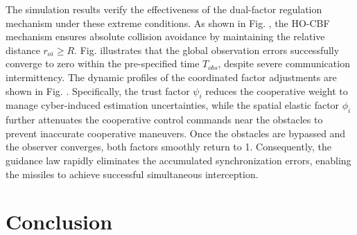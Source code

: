 \documentclass[lettersize,journal]{IEEEtran}
\begin{document}
The simulation results verify the effectiveness of the dual-factor regulation mechanism under these extreme conditions. As shown in Fig. , the HO-CBF mechanism ensures absolute collision avoidance by maintaining the relative distance $r_{oi} \ge R$. Fig. illustrates that the global observation errors successfully converge to zero within the pre-specified time $T_{obs}$, despite severe communication intermittency. The dynamic profiles of the coordinated factor adjustments are shown in Fig. . Specifically, the trust factor $\psi_i$ reduces the cooperative weight to manage cyber-induced estimation uncertainties, while the spatial elastic factor $\phi_i$ further attenuates the cooperative control commands near the obstacles to prevent inaccurate cooperative maneuvers. Once the obstacles are bypassed and the observer converges, both factors smoothly return to 1. Consequently, the guidance law rapidly eliminates the accumulated synchronization errors, enabling the missiles to achieve successful simultaneous interception.

\section{Conclusion}









\end{document}
